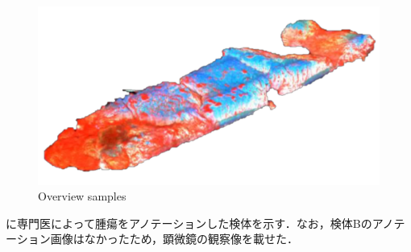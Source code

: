 \begin{figure}[H]
\begin{minipage}{0.45\columnwidth}
	\end{minipage}
	\begin{minipage}{0.45\linewidth}
		\centering
		\includegraphics[clip, width=\linewidth]{fig/chapter3/3d_samples/sample_D_clip}
	\end{minipage}
	
	\caption{Overview samples}
	\label{fig:3D検体一覧}
	
\end{figure}


に専門医によって腫瘍をアノテーションした検体を示す．なお，検体Bのアノテーション画像はなかったため，顕微鏡の観察像を載せた．


